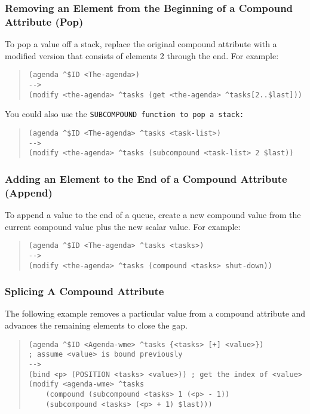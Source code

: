 \subsubsection*{Removing an Element from the Beginning of a Compound
  Attribute (Pop)}

To pop a value off a stack, replace the original compound attribute
with a modified version that consists of elements 2 through the
end. For example:
\begin{quote}
\begin{verbatim}
(agenda ^$ID <The-agenda>)
-->
(modify <the-agenda> ^tasks (get <the-agenda> ^tasks[2..$last]))
\end{verbatim}
\end{quote}
You could also use the \tt{SUBCOMPOUND} function to pop a stack:
\begin{quote}
\begin{verbatim}
(agenda ^$ID <The-agenda> ^tasks <task-list>)
-->
(modify <the-agenda> ^tasks (subcompound <task-list> 2 $last))
\end{verbatim}
\end{quote}

\subsubsection*{Adding an Element to the End of a Compound Attribute
  (Append)}

To append a value to the end of a queue, create a new compound value
from the current compound value plus the new scalar value. For
example:
\begin{quote}
\begin{verbatim}
(agenda ^$ID <The-agenda> ^tasks <tasks>)
-->
(modify <the-agenda> ^tasks (compound <tasks> shut-down))
\end{verbatim}
\end{quote}

\subsubsection*{Splicing A Compound Attribute}

The following example removes a particular value from a compound
attribute and advances the remaining elements to close the gap.
\begin{quote}
\begin{verbatim}
(agenda ^$ID <Agenda-wme> ^tasks {<tasks> [+] <value>})
; assume <value> is bound previously
-->
(bind <p> (POSITION <tasks> <value>)) ; get the index of <value>
(modify <agenda-wme> ^tasks
    (compound (subcompound <tasks> 1 (<p> - 1))
    (subcompound <tasks> (<p> + 1) $last)))
\end{verbatim}
\end{quote}


